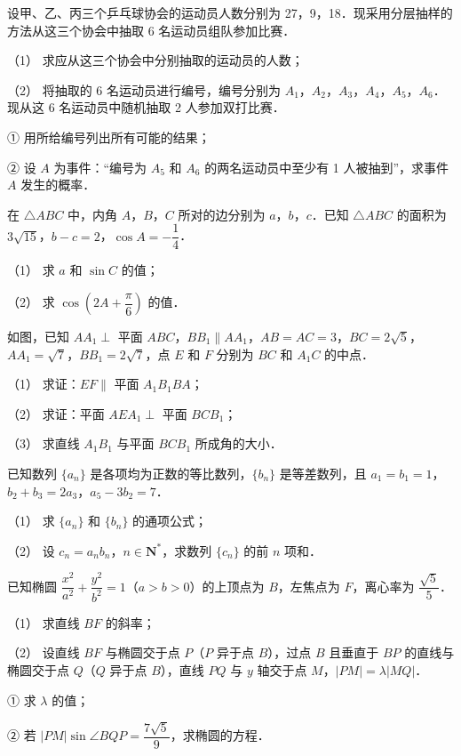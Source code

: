 \begin{question}
设甲、乙、丙三个乒乓球协会的运动员人数分别为 27，9，18．现采用分层抽样的方法从这三个协会中抽取 6 名运动员组队参加比赛．

（1） 求应从这三个协会中分别抽取的运动员的人数；

（2） 将抽取的 6 名运动员进行编号，编号分别为 \(A_1\)，\(A_2\)，\(A_3\)，\(A_4\)，\(A_5\)，\(A_6\)．现从这 6 名运动员中随机抽取 2 人参加双打比赛．

① 用所给编号列出所有可能的结果；

② 设 \(A\) 为事件：“编号为 \(A_5\) 和 \(A_6\) 的两名运动员中至少有 1 人被抽到”，求事件 \(A\) 发生的概率．

\end{question}
\begin{question}
在 \(\triangle ABC\) 中，内角 \(A\)，\(B\)，\(C\) 所对的边分别为 \(a\)，\(b\)，\(c\)．已知 \(\triangle ABC\) 的面积为 \(3\sqrt{15}\)，\(b-c=2\)，\(\cos A=-\dfrac{1}{4}\)．

（1） 求 \(a\) 和 \(\sin C\) 的值；

（2） 求 \(\cos\left(2A+\dfrac{\pi}{6}\right)\) 的值．

\Needspace{0.4\textheight}
\end{question}
\begin{question}
如图，已知 \(AA_1\perp\) 平面 \(ABC\)，\(BB_1\parallel AA_1\)，\(AB=AC=3\)，\(BC=2\sqrt{5}\)，\(AA_1=\sqrt{7}\)，\(BB_1=2\sqrt{7}\)，点 \(E\) 和 \(F\) 分别为 \(BC\) 和 \(A_1C\) 的中点．
\nopagebreak[4]
\begin{center}\end{center}
\nopagebreak[4]
（1） 求证：\(EF\parallel\) 平面 \(A_1B_1BA\)；

（2） 求证：平面 \(AEA_1\perp\) 平面 \(BCB_1\)；

（3） 求直线 \(A_1B_1\) 与平面 \(BCB_1\) 所成角的大小．

\end{question}
\begin{question}
已知数列 \(\{a_n\}\) 是各项均为正数的等比数列，\(\{b_n\}\) 是等差数列，且 \(a_1=b_1=1\)，\(b_2+b_3=2a_3\)，\(a_5-3b_2=7\)．

（1） 求 \(\{a_n\}\) 和 \(\{b_n\}\) 的通项公式；

（2） 设 \(c_n=a_nb_n\)，\(n\in\mathbf{N}^*\)，求数列 \(\{c_n\}\) 的前 \(n\) 项和．

\end{question}
\begin{question}
已知椭圆 \(\dfrac{x^2}{a^2}+\dfrac{y^2}{b^2}=1\)（\(a>b>0\)）的上顶点为 \(B\)，左焦点为 \(F\)，离心率为 \(\dfrac{\sqrt{5}}{5}\)．

（1） 求直线 \(BF\) 的斜率；

（2） 设直线 \(BF\) 与椭圆交于点 \(P\)（\(P\) 异于点 \(B\)），过点 \(B\) 且垂直于 \(BP\) 的直线与椭圆交于点 \(Q\)（\(Q\) 异于点 \(B\)），直线 \(PQ\) 与 \(y\) 轴交于点 \(M\)，\(|PM|=\lambda|MQ|\)．

① 求 \(\lambda\) 的值；

② 若 \(|PM|\sin\angle BQP=\dfrac{7\sqrt{5}}{9}\)，求椭圆的方程．

\end{question}
